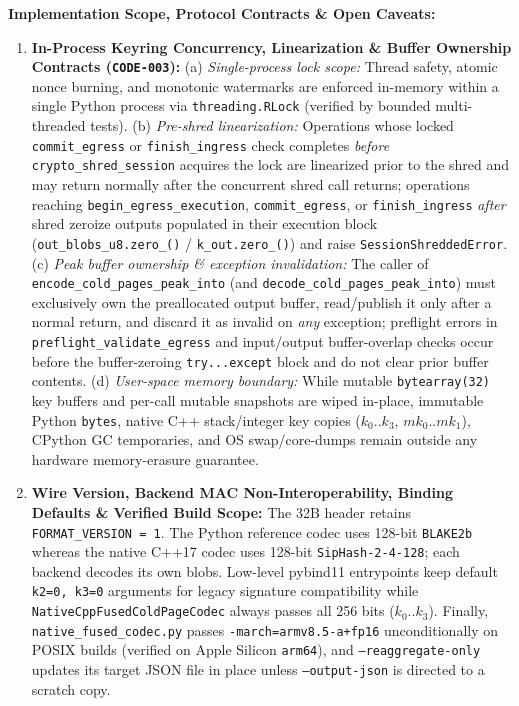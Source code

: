 \documentclass[10pt,twocolumn]{article}
\begin{document}
\textbf{Implementation Scope, Protocol Contracts \& Open Caveats:}
\begin{enumerate}
    \item \textbf{In-Process Keyring Concurrency, Linearization \& Buffer Ownership Contracts (\texttt{CODE-003}):}
    (a) \textit{Single-process lock scope:} Thread safety, atomic nonce burning, and monotonic watermarks are enforced in-memory within a single Python process via \texttt{threading.RLock} (verified by bounded multi-threaded tests).
    (b) \textit{Pre-shred linearization:} Operations whose locked \texttt{commit\_egress} or \texttt{finish\_ingress} check completes \textit{before} \texttt{crypto\_shred\_session} acquires the lock are linearized prior to the shred and may return normally after the concurrent shred call returns; operations reaching \texttt{begin\_egress\_execution}, \texttt{commit\_egress}, or \texttt{finish\_ingress} \textit{after} shred zeroize outputs populated in their execution block (\texttt{out\_blobs\_u8.zero\_()} / \texttt{k\_out.zero\_()}) and raise \texttt{SessionShreddedError}.
    (c) \textit{Peak buffer ownership \& exception invalidation:} The caller of \texttt{encode\_cold\_pages\_peak\_into} (and \texttt{decode\_cold\_pages\_peak\_into}) must exclusively own the preallocated output buffer, read/publish it only after a normal return, and discard it as invalid on \textit{any} exception; preflight errors in \texttt{preflight\_validate\_egress} and input/output buffer-overlap checks occur before the buffer-zeroing \texttt{try...except} block and do not clear prior buffer contents.
    (d) \textit{User-space memory boundary:} While mutable \texttt{bytearray(32)} key buffers and per-call mutable snapshots are wiped in-place, immutable Python \texttt{bytes}, native C++ stack/integer key copies ($k_0..k_3$, $mk_0..mk_1$), CPython GC temporaries, and OS swap/core-dumps remain outside any hardware memory-erasure guarantee.
    \item \textbf{Wire Version, Backend MAC Non-Interoperability, Binding Defaults \& Verified Build Scope:} The 32B header retains \texttt{FORMAT\_VERSION = 1}. The Python reference codec uses 128-bit \texttt{BLAKE2b} whereas the native C++17 codec uses 128-bit \texttt{SipHash-2-4-128}; each backend decodes its own blobs. Low-level pybind11 entrypoints keep default \texttt{k2=0, k3=0} arguments for legacy signature compatibility while \texttt{NativeCppFusedColdPageCodec} always passes all 256 bits ($k_0..k_3$). Finally, \texttt{native\_fused\_codec.py} passes \texttt{-march=armv8.5-a+fp16} unconditionally on POSIX builds (verified on Apple Silicon \texttt{arm64}), and \texttt{--reaggregate-only} updates its target JSON file in place unless \texttt{--output-json} is directed to a scratch copy.
\end{enumerate}
\end{document}
